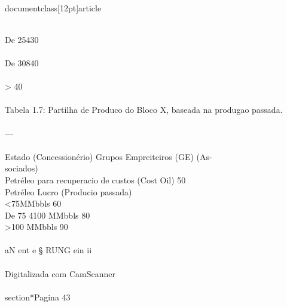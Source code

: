 \\documentclass[12pt]{article}
\begin{document}
\\
De 25430\\%
\\
De 30840 \\%
\\
> 40\\%
\\
Tabela 1.7: Partilha de Produco do Bloco X, baseada na produgao passada.\\
\\
—\\
\\
Estado (Concessionério) Grupos Empreiteiros (GE) (As-\\
sociados)\\
Petréleo para recuperacio de custos (Cost Oil) 50\\%
Petréleo Lucro (Producio passada)\\
<75MMbbls 60\\%
De 75 4100 MMbbls 80\\%
>100 MMbbls 90\\%
\\
aN ent e § RUNG ein ii\\
\\
Digitalizada com CamScanner\\

\\section*{Pagina 43}
\end{document}
